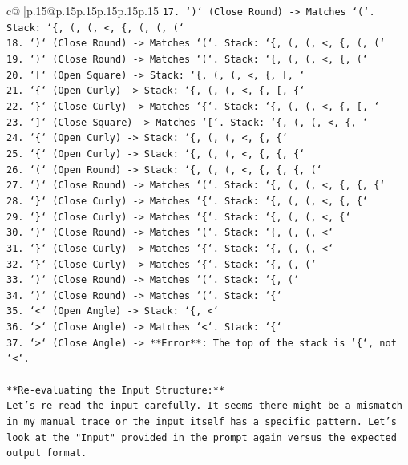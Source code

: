 \documentclass{article}
\begin{document}
{\begin{supertabular}{c@{$\;$}|p{.15\linewidth}@{}p{.15\linewidth}p{.15\linewidth}p{.15\linewidth}p{.15\linewidth}p{.15\linewidth}}
{{{\texttt{17. `)` (Close Round) {-}> Matches `(`. Stack: `\{, (, (, <, \{, (, (, (`} \\
\texttt{18. `)` (Close Round) {-}> Matches `(`. Stack: `\{, (, (, <, \{, (, (`} \\
\texttt{19. `)` (Close Round) {-}> Matches `(`. Stack: `\{, (, (, <, \{, (`} \\
\texttt{20. `{[}` (Open Square) {-}> Stack: `\{, (, (, <, \{, {[}, `} \\
\texttt{21. `\{` (Open Curly) {-}> Stack: `\{, (, (, <, \{, {[}, \{`} \\
\texttt{22. `\}` (Close Curly) {-}> Matches `\{`. Stack: `\{, (, (, <, \{, {[}, `} \\
\texttt{23. `{]}` (Close Square) {-}> Matches `{[}`. Stack: `\{, (, (, <, \{, `} \\
\texttt{24. `\{` (Open Curly) {-}> Stack: `\{, (, (, <, \{, \{`} \\
\texttt{25. `\{` (Open Curly) {-}> Stack: `\{, (, (, <, \{, \{, \{`} \\
\texttt{26. `(` (Open Round) {-}> Stack: `\{, (, (, <, \{, \{, \{, (`} \\
\texttt{27. `)` (Close Round) {-}> Matches `(`. Stack: `\{, (, (, <, \{, \{, \{`} \\
\texttt{28. `\}` (Close Curly) {-}> Matches `\{`. Stack: `\{, (, (, <, \{, \{`} \\
\texttt{29. `\}` (Close Curly) {-}> Matches `\{`. Stack: `\{, (, (, <, \{`} \\
\texttt{30. `)` (Close Round) {-}> Matches `(`. Stack: `\{, (, (, <`} \\
\texttt{31. `\}` (Close Curly) {-}> Matches `\{`. Stack: `\{, (, (, <`} \\
\texttt{32. `\}` (Close Curly) {-}> Matches `\{`. Stack: `\{, (, (`} \\
\texttt{33. `)` (Close Round) {-}> Matches `(`. Stack: `\{, (`} \\
\texttt{34. `)` (Close Round) {-}> Matches `(`. Stack: `\{`} \\
\texttt{35. `<` (Open Angle) {-}> Stack: `\{, <`} \\
\texttt{36. `>` (Close Angle) {-}> Matches `<`. Stack: `\{`} \\
\texttt{37. `>` (Close Angle) {-}> **Error**: The top of the stack is `\{`, not `<`.} \\
\\ 
\texttt{**Re{-}evaluating the Input Structure:**} \\
\texttt{Let's re{-}read the input carefully. It seems there might be a mismatch in my manual trace or the input itself has a specific pattern. Let's look at the "Input" provided in the prompt again versus the expected output format.} \\
}}}
\end{supertabular}}
\end{document}
